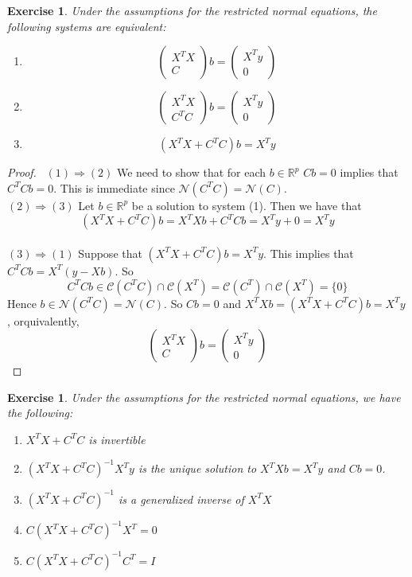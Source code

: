 \documentclass[12pt]{amsart}
\newtheorem{ex}[thm]{Exercise}
\newcommand{\R}{\mathbb{R}}
\newcommand{\MC}{\mathcal{C}}
\newcommand{\MN}{\mathcal{N}}
\begin{document}
\begin{ex}
Under the assumptions for the restricted normal equations, the following systems are equivalent:
\begin{enumerate}
\item $$\begin{pmatrix}
X^TX \\
C
\end{pmatrix} b = 
\begin{pmatrix}
X^Ty \\
0
\end{pmatrix} $$
\item $$\begin{pmatrix}
X^TX \\
C^TC
\end{pmatrix} b = 
\begin{pmatrix}
X^Ty \\
0
\end{pmatrix} $$
\item $$(X^TX + C^TC)b = X^Ty$$
\end{enumerate}
\end{ex}

\begin{proof}\
$(1) \Rightarrow (2)$ We need to show that for each $b \in \R^p$ $Cb = 0 $ implies that $C^TCb = 0 $. This is immediate since $\MN(C^TC) = \MN(C)$.\vspace{3mm}\\ 
$(2) \Rightarrow (3)$ Let $b \in \R^p$ be a solution to system (1). Then we have that $$(X^TX + C^TC)b = X^TXb + C^TCb = X^Ty + 0 = X^Ty$$ \vspace{3mm}\\ 
$(3) \Rightarrow (1)$ Suppose that $(X^TX + C^TC)b = X^Ty$. This implies that $C^TCb = X^T(y - Xb)$. So $$C^TCb \in \MC(C^TC) \cap \MC(X^T) =  \MC(C^T) \cap \MC(X^T)= \{0\}$$ Hence $b \in \MN(C^TC) = \MN(C)$. So $Cb = 0$ and $X^TXb =(X^TX+C^TC)b= X^Ty$, orquivalently, $$\begin{pmatrix}
X^TX \\
C
\end{pmatrix} b = 
\begin{pmatrix}
X^Ty \\
0
\end{pmatrix} $$

\end{proof}

\begin{ex}
Under the assumptions for the restricted normal equations, we have the following: 
\begin{enumerate}
\item $X^TX +C^TC$ is invertible
\item $(X^TX +C^TC)^{-1}X^Ty$ is the unique solution to $X^TXb = X^Ty$ and $Cb = 0$.
\item $(X^TX +C^TC)^{-1}$ is a generalized inverse of $X^TX$
\item $C(X^TX +C^TC)^{-1}X^T = 0$
\item $C(X^TX +C^TC)^{-1}C^T = I$
\end{enumerate}
\end{ex}
\end{document}
